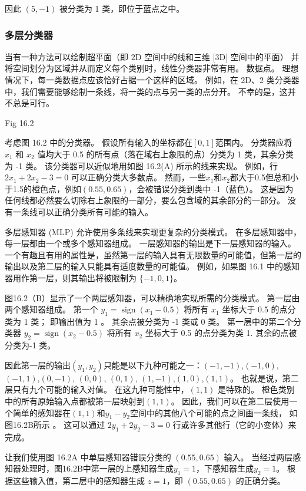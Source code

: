 因此 $(5,-1)$ 被分类为 1 类，即位于蓝点之中。

\subsubsection{多层分类器}
当有一种方法可以绘制超平面（即 $2 \mathrm{D}$ 空间中的线和三维 [3D] 空间中的平面）
并将空间划分为区域并从而定义每个类别时，线性分类器非常有用。 数据点。 
理想情况下，每一类数据点应该恰好占据一个这样的区域。 
例如，在 2D、2 类分类器中，我们需要能够绘制一条线，将一类的点与另一类的点分开。 不幸的是，这并不总是可行。

{\color{red} Fig 16.2}

考虑图 16.2 中的分类器。 假设所有输入的坐标都在$[0,1]$范围内。 
分类器应将 $x_{1}$ 和 $x_{2}$ 值均大于 0.5 的所有点（落在域右上象限的点）分类为 1 类，其余分类为 -1 类。 
该分类器可以近似地用如图 16.2(A) 所示的线来实现。 例如，行 $2 x_{1}+2 x_{2}-3=0$ 可以正确分类大多数点。 
然而，一些$x_{1}$和$x_{2}$都大于0.5但总和小于1.5的橙色点，例如$(0.55,0.65)$，会被错误分类到类中 -1（蓝色）。 
这是因为任何线都必然要么切除右上象限的一部分，要么包含域的其余部分的一部分。 没有一条线可以正确分类所有可能的输入。

多层感知器 (MLP) 允许使用多条线来实现更复杂的分类模式。 在多层感知器中，每一层都由一个或多个感知器组成。 
一层感知器的输出是下一层感知器的输入。 
一个有趣且有用的属性是，虽然第一层的输入具有无限数量的可能值，但第一层的输出以及第二层的输入只能具有适度数量的可能值。 
例如，如果图 16.1 中的感知器用作第一层，则其输出将被限制为 $\{-1,0,1\}$。

图16.2（B）显示了一个两层感知器，可以精确地实现所需的分类模式。 第一层由两个感知器组成。 
第一个 $y_{1}=\operatorname{sign}\left(x_{1}-0.5\right)$ 将所有 $x_{1}$ 坐标大于 0.5 的点分类为 1 类； 
即输出值为 1 。 其余点被分类为 -1 类或 0 类。 
第一层中的第二个分类器 $y_{2}=\operatorname{sign}\left(x_{2}-0.5\right)$ 将所有 $x_{2}$ 坐标大于 0.5 的点分类为类 1. 其余的点被分类为-1 类。

因此第一层的输出$\left(y_{1}, y_{2}\right)$只能是以下九种可能之一：$(-1,-1)$,$(-1,0)$, $(-1,1)$,$(0,-1)$, 
$(0,0)$, $(0,1)$, $(1,-1)$,$(1,0)$,$(1,1)$。 
也就是说，第二层只有九个可能的输入对值。 在这九种可能性中，$(1,1)$ 是特殊的。 
橙色类别中的所有原始输入点都被第一层映射到$(1,1)$。 
因此，我们可以在第二层使用一个简单的感知器在$(1,1)$和$y_{1}-y_{2}$空间中的其他八个可能的点之间画一条线，
如图16.2B所示 。 这可以通过 $2 y_{1}+2 y_{2}-3=0$ 行或许多其他行（它的小变体）来完成。

让我们使用图 16.2A 中单层感知器错误分类的 $(0.55,0.65)$ 输入。 
当经过两层感知器处理时，图16.2B中第一层的上感知器生成$y_{1}=1$，下感知器生成$y_{2}=1$。 
根据这些输入值，第二层中的感知器生成 $z=1$，即 $(0.55,0.65)$ 的正确分类。


